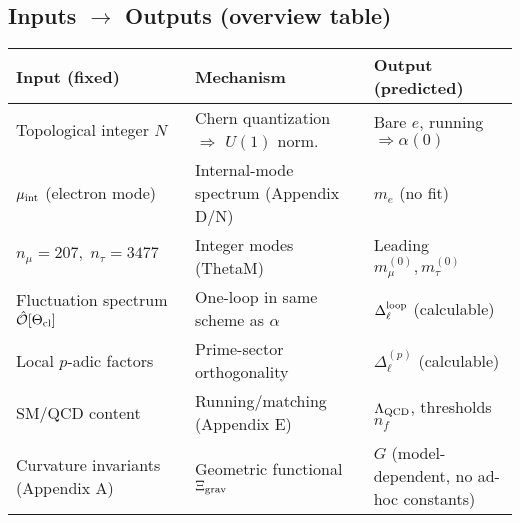 \subsection{Inputs $\to$ Outputs (overview table)}
\begin{center}
\begin{tabular}{l l l}
\hline
\textbf{Input (fixed)} & \textbf{Mechanism} & \textbf{Output (predicted)}\\
\hline
Topological integer $N$ & Chern quantization $\Rightarrow$ $U(1)$ norm. & Bare $e$, running $\Rightarrow \alpha(0)$\\
$\mu_{\rm int}$ (electron mode) & Internal-mode spectrum (Appendix D/N) & $m_e$ (no fit)\\
$n_\mu=207,\; n_\tau=3477$ & Integer modes (ThetaM) & Leading $m_\mu^{(0)}, m_\tau^{(0)}$\\
Fluctuation spectrum $\hat{\mathcal O}[\Theta_{\rm cl}]$ & One-loop in same scheme as $\alpha$ & $\Delta_\ell^{\rm loop}$ (calculable)\\
Local $p$-adic factors & Prime-sector orthogonality & $\Delta_\ell^{(p)}$ (calculable)\\
SM/QCD content & Running/matching (Appendix E) & $\Lambda_{\rm QCD}$, thresholds $n_f$\\
Curvature invariants (Appendix A) & Geometric functional $\Xi_{\rm grav}$ & $G$ (model-dependent, no ad-hoc constants)\\
\hline
\end{tabular}
\end{center}


